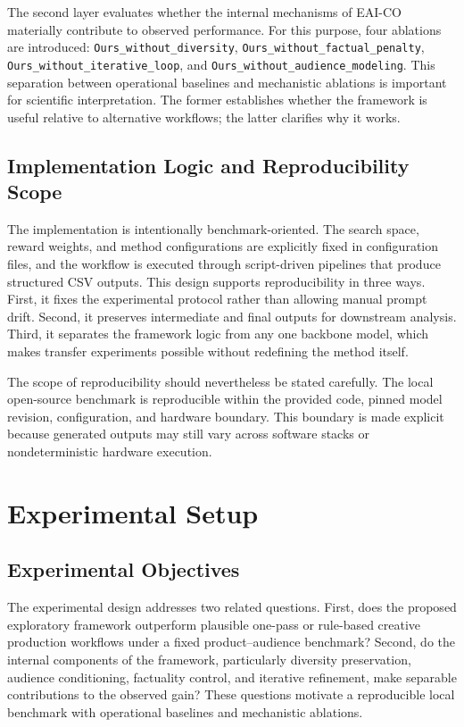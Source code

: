 \documentclass[applsci,article,submit,pdftex,moreauthors]{Definitions/mdpi}
\begin{document}
The second layer evaluates whether the internal mechanisms of EAI-CO materially contribute to observed performance. For this purpose, four ablations are introduced: \texttt{Ours\_without\_diversity}, \texttt{Ours\_without\_factual\_penalty}, \texttt{Ours\_without\_iterative\_loop}, and \texttt{Ours\_without\_audience\_modeling}. This separation between operational baselines and mechanistic ablations is important for scientific interpretation. The former establishes whether the framework is useful relative to alternative workflows; the latter clarifies why it works.

\subsection{Implementation Logic and Reproducibility Scope}

The implementation is intentionally benchmark-oriented. The search space, reward weights, and method configurations are explicitly fixed in configuration files, and the workflow is executed through script-driven pipelines that produce structured CSV outputs. This design supports reproducibility in three ways. First, it fixes the experimental protocol rather than allowing manual prompt drift. Second, it preserves intermediate and final outputs for downstream analysis. Third, it separates the framework logic from any one backbone model, which makes transfer experiments possible without redefining the method itself.

The scope of reproducibility should nevertheless be stated carefully. The local open-source benchmark is reproducible within the provided code, pinned model revision, configuration, and hardware boundary. This boundary is made explicit because generated outputs may still vary across software stacks or nondeterministic hardware execution.

\section{Experimental Setup}

\subsection{Experimental Objectives}

The experimental design addresses two related questions. First, does the proposed exploratory framework outperform plausible one-pass or rule-based creative production workflows under a fixed product--audience benchmark? Second, do the internal components of the framework, particularly diversity preservation, audience conditioning, factuality control, and iterative refinement, make separable contributions to the observed gain? These questions motivate a reproducible local benchmark with operational baselines and mechanistic ablations.
\end{document}
